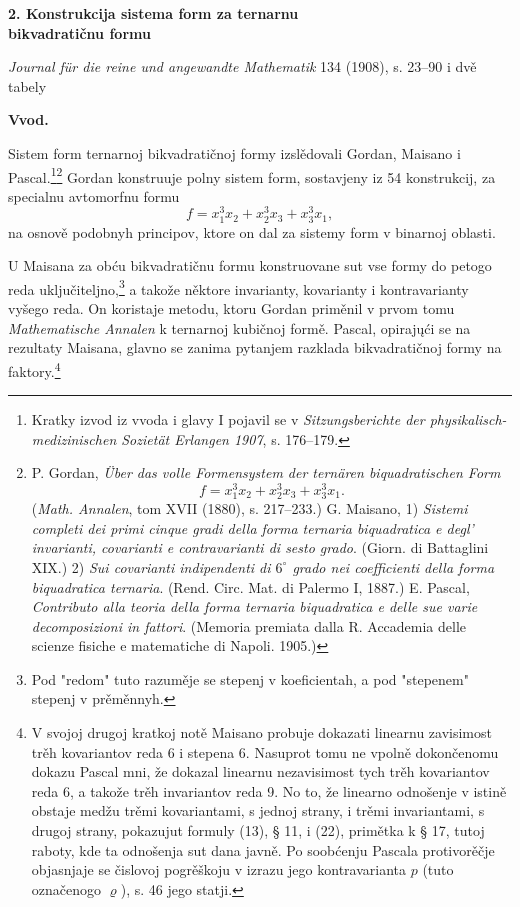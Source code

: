 \documentclass[11pt]{article}
\begin{document}
\begin{center}
{\Large\bfseries 2. Konstrukcija sistema form za ternarnu\\ bikvadratičnu formu}\par
\vspace{1.5em}
\emph{Journal für die reine und angewandte Mathematik} 134 (1908), s. 23--90 i dvě tabely
\end{center}

\vspace{3em}

\begin{center}
\textbf{Vvod.}
\end{center}

Sistem form ternarnoj bikvadratičnoj formy izslědovali Gordan, Maisano i Pascal.\footnote{Kratky izvod iz vvoda i glavy I pojavil se v \emph{Sitzungsberichte der physikalisch-medizinischen Sozietät Erlangen 1907}, s. 176--179.}\footnote{P. Gordan, \emph{Über das volle Formensystem der ternären biquadratischen Form}
\[
f=x_1^3x_2+x_2^3x_3+x_3^3x_1.
\]
(\emph{Math. Annalen}, tom XVII (1880), s. 217--233.)
G. Maisano, 1) \emph{Sistemi completi dei primi cinque gradi della forma ternaria biquadratica e degl' invarianti, covarianti e contravarianti di sesto grado}. (Giorn. di Battaglini XIX.)
2) \emph{Sui covarianti indipendenti di $6^\circ$ grado nei coefficienti della forma biquadratica ternaria}. (Rend. Circ. Mat. di Palermo I, 1887.)
E. Pascal, \emph{Contributo alla teoria della forma ternaria biquadratica e delle sue varie decomposizioni in fattori}. (Memoria premiata dalla R. Accademia delle scienze fisiche e matematiche di Napoli. 1905.)}
Gordan konstruuje polny sistem form, sostavjeny iz 54 konstrukcij, za specialnu avtomorfnu formu
\[
f=x_1^3x_2+x_2^3x_3+x_3^3x_1,
\]
na osnově podobnyh principov, ktore on dal za sistemy form v binarnoj oblasti.

U Maisana za obću bikvadratičnu formu konstruovane sut vse formy do petogo reda uključiteljno,\footnote{Pod "redom" tuto razuměje se stepenj v koeficientah, a pod "stepenem" stepenj v prěměnnyh.}
a takože něktore invarianty, kovarianty i kontravarianty vyšego reda. On koristaje metodu, ktoru Gordan priměnil v prvom tomu \emph{Mathematische Annalen} k ternarnoj kubičnoj formě. Pascal, opirajųći se na rezultaty Maisana, glavno se zanima pytanjem razklada bikvadratičnoj formy na faktory.\footnote{V svojoj drugoj kratkoj notě Maisano probuje dokazati linearnu zavisimost trěh kovariantov reda 6 i stepena 6. Nasuprot tomu ne vpolně dokončenomu dokazu Pascal mni, že dokazal linearnu nezavisimost tych trěh kovariantov reda 6, a takože trěh invariantov reda 9. No to, že linearno odnošenje v istině obstaje medžu trěmi kovariantami, s jednoj strany, i trěmi invariantami, s drugoj strany, pokazujut formuly (13), § 11, i (22), primětka k § 17, tutoj raboty, kde ta odnošenja sut dana javně. Po soobćenju Pascala protivorěčje objasnjaje se čislovoj pogrěškoju v izrazu jego kontravarianta $p$ (tuto označenogo $\varrho$), s. 46 jego statji.}
\end{document}
